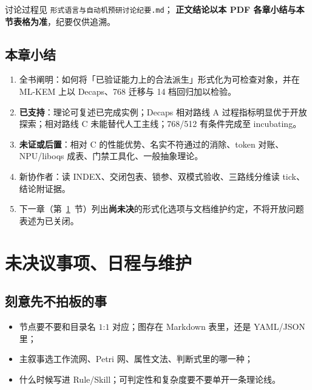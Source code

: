 \documentclass[UTF8,a4paper,11pt]{ctexart}
\theoremstyle{definition}
\theoremstyle{plain}
\theoremstyle{remark}
\numberwithin{figure}{section}
\numberwithin{table}{section}
\begin{document}
讨论过程见 \texttt{形式语言与自动机预研讨论纪要.md}；
\textbf{正文结论以本 PDF 各章小结与本节表格为准}，纪要仅供追溯。

\subsection{本章小结}
\label{sec:summary-end}

\begin{enumerate}
  \item 全书阐明：如何将「已验证能力上的合法派生」形式化为可检查对象，并在 ML-KEM 上以 Decaps、768 迁移与 14 档回归加以检验。
  \item \textbf{已支持}：理论可复述已完成实例；Decaps 相对路线 A 过程指标明显优于开放探索；相对路线 C 未能替代人工主线；768/512 有条件完成至 incubating。
  \item \textbf{未证或后置}：相对 C 的性能优势、名实不符通过的消除、token 对账、NPU/liboqs 成表、门禁工具化、一般抽象理论。
  \item 新协作者：读 INDEX、交闭包表、锁参、双模式验收、三路线分维读 tick、结论附证据。
  \item 下一章（第~\ref{sec:open}~节）列出\textbf{尚未决}的形式化选项与文档维护约定，不将开放问题表述为已关闭。
\end{enumerate}

\section{未决议事项、日程与维护}
\label{sec:open}

\subsection{刻意先不拍板的事}
\begin{itemize}
  \item 节点要不要和目录名 $1$:$1$ 对应；图存在 Markdown 表里，还是 YAML/JSON 里；
  \item 主叙事选工作流网、Petri 网、属性文法、判断式里的哪一种；
  \item 什么时候写进 Rule/Skill；可判定性和复杂度要不要单开一条理论线。
\end{itemize}
\end{document}
